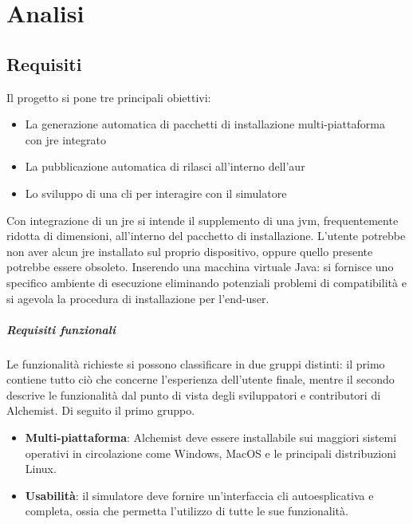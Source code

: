 \chapter{Analisi}

\section{Requisiti}

Il progetto si pone tre principali obiettivi:
\begin{itemize}
	\setlength\itemsep{0.8em}
	\item La generazione automatica di pacchetti di installazione multi-piattaforma \\ con \ac{jre} integrato
	\item La pubblicazione automatica di rilasci all'interno dell'\ac{aur}
	\item Lo sviluppo di una \ac{cli} per interagire con il simulatore
\end{itemize}
Con integrazione di un \ac{jre} si intende il supplemento di una \ac{jvm}, frequentemente ridotta di dimensioni, all'interno del pacchetto di installazione.
L'utente potrebbe non aver alcun \ac{jre} installato sul proprio dispositivo, oppure quello presente potrebbe essere obsoleto. Inserendo una macchina virtuale Java: si fornisce uno specifico ambiente di esecuzione eliminando potenziali problemi di compatibilità e si agevola la procedura di installazione per l'end-user.

\paragraph{Requisiti funzionali}

Le funzionalità richieste si possono classificare in due gruppi distinti: il primo contiene tutto ciò che concerne l'esperienza dell'utente finale, mentre il secondo descrive le funzionalità dal punto di vista degli sviluppatori e contributori di Alchemist. Di seguito il primo gruppo.
\begin{itemize}
	\item \textbf{Multi-piattaforma}: Alchemist deve essere installabile sui maggiori sistemi operativi in circolazione come Windows, MacOS e le principali distribuzioni Linux.
	\item \textbf{Usabilità}: il simulatore deve fornire un'interfaccia \ac{cli} autoesplicativa e completa, ossia che permetta l'utilizzo di tutte le sue funzionalità.
\end{itemize}


